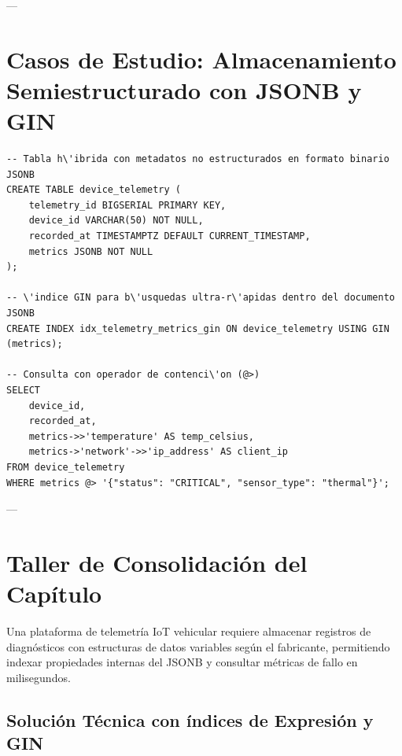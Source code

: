---

\section{Casos de Estudio: Almacenamiento Semiestructurado con JSONB y GIN}

\begin{lstlisting}[style=sqlstyle, caption={Modelado h\'ibrido relacional/documental en PostgreSQL}]
-- Tabla h\'ibrida con metadatos no estructurados en formato binario JSONB
CREATE TABLE device_telemetry (
    telemetry_id BIGSERIAL PRIMARY KEY,
    device_id VARCHAR(50) NOT NULL,
    recorded_at TIMESTAMPTZ DEFAULT CURRENT_TIMESTAMP,
    metrics JSONB NOT NULL
);

-- \'indice GIN para b\'usquedas ultra-r\'apidas dentro del documento JSONB
CREATE INDEX idx_telemetry_metrics_gin ON device_telemetry USING GIN (metrics);

-- Consulta con operador de contenci\'on (@>)
SELECT
    device_id,
    recorded_at,
    metrics->>'temperature' AS temp_celsius,
    metrics->'network'->>'ip_address' AS client_ip
FROM device_telemetry
WHERE metrics @> '{"status": "CRITICAL", "sensor_type": "thermal"}';
\end{lstlisting}

---

\section{Taller de Consolidaci\'on del Cap\'itulo}

\begin{businessproblem}
Una plataforma de telemetr\'ia IoT vehicular requiere almacenar registros de diagn\'osticos con estructuras de datos variables seg\'un el fabricante, permitiendo indexar propiedades internas del JSONB y consultar m\'etricas de fallo en milisegundos.
\end{businessproblem}

\subsection{Soluci\'on T\'ecnica con \'indices de Expresi\'on y GIN}

